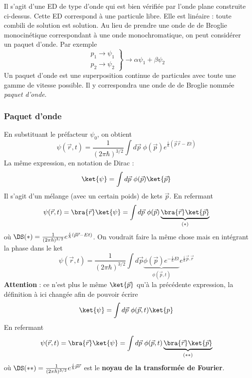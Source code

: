 		Il s'agit d'une ED de type d'onde qui est bien vérifiée par l'onde plane construite ci-dessus. 
		Cette ED correspond à une particule libre. Elle est linéaire : toute combili de solution est 
		solution. Au lieu de prendre une onde de de Broglie monocinétique correspondant à une onde 
		monochromatique, on peut considérer un paquet d'onde. Par exemple
		\begin{equation}
		\left.\begin{array}{ll}
		p_1 \rightarrow \psi_1\\
		p_2 \rightarrow \psi_2
		\end{array}\right\}\longrightarrow \alpha\psi_1+\beta\psi_2
		\end{equation}
		Un paquet d'onde est une superposition continue de particules avec toute une gamme de vitesse 
		possible. Il y correspondra une onde de de Broglie nommée \textit{paquet d'onde}.

		\subsubsection{Paquet d'onde}
		En substituant le préfacteur $\psi_0$, on obtient
		\begin{equation}
		\psi(\vec{r},t) = \dfrac{1}{(2\pi\hbar)^{3/2}}\int d\vec{p}\ \phi(\vec{p})e^{\frac{i}{\hbar}(\vec{p}
		\vec{r}-Et)}
		\end{equation}
		La même expression, en notation de Dirac :
		\begin{equation}
		\ket{\psi} = \int d\vec{p}\ \phi(\vec{p})\ket{\vec{p}}
		\end{equation}
		Il s'agit d'un mélange (avec un certain poids) de kets $\vec{p}$. En refermant
		\begin{equation}
		\psi(\vec{r},t) = \bra{\vec{r}}\ket{\psi} = \int d\vec{p}\ \phi(\vec{p})\underbrace{
		\bra{\vec{r}}\ket{\vec{p}}}_{(*)}
		\end{equation}
		où $\DS (*) = \frac{1}{(2\pi\hbar)^{3/2}}e^{\frac{i}{\hbar}(\vec{p}\vec{r}-Et)}$. On voudrait 
		faire la même chose mais en intégrant la phase dans le ket
		\begin{equation}
		\psi(\vec{r},t) = \frac{1}{(2\pi\hbar)^{3/2}}\int d\vec{p} \underbrace{\phi(\vec{p})e^{-\frac{i}
		{\hbar}Et}}_{\phi(\vec{p},t)}e^{\frac{i}{\hbar}\vec{p}.\vec{r}}
		\end{equation}
		\textbf{Attention} : ce n'est plus le même $\ket{\vec{p}}$ qu'à la précédente expression, la 
		définition à ici changée afin de pouvoir écrire
		\begin{equation}
		\ket{\psi} = \int d\vec{p}\ \phi(\vec{p},t)\ket{p}
		\end{equation}
		En refermant
		\begin{equation}
		\psi(\vec{r},t) = \bra{\vec{r}}\ket{\psi} = \int d\vec{p}\ \phi(\vec{p},t)
		\underbrace{\bra{\vec{r}}\ket{\vec{p}}}_{(**)}
		\end{equation}
		où $\DS (**)= \frac{1}{(2\pi\hbar)^{3/2}}e^{\frac{i}{\hbar}\vec{p}\vec{r}}$ est le 
		\textbf{noyau de la transformée de Fourier}.\\
		
